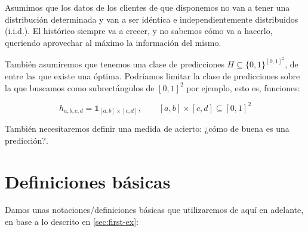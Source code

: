 Asumimos que los datos de los clientes de que disponemos no van a tener una distribución determinada y
van a ser idéntica e independientemente distribuidos (i.i.d.). El histórico siempre va a crecer, y no sabemos cómo va a hacerlo, queriendo aprovechar
al máximo la información del mismo.

También asumiremos que tenemos una clase de predicciones $H \subseteq \{0,1\}^{[0,1]^2}$, de entre las que existe
una óptima. Podríamos limitar la clase de predicciones sobre la que buscamos como subrectángulos de $[0,1]^2$ por ejemplo, 
esto es, funciones:

\[h_{a,b,c,d} = \mathds{1}_{[a,b]\times[c,d]}, \qquad [a,b]\times [c,d] \subseteq [0,1]^2\]


También necesitaremos definir una medida de acierto: ¿cómo de buena es una predicción?.

\section{Definiciones básicas}
\label{sec:defs}

Damos unas notaciones/definiciones básicas que utilizaremos de aquí en adelante, en base a lo descrito en \ref{sec:first-ex}:

